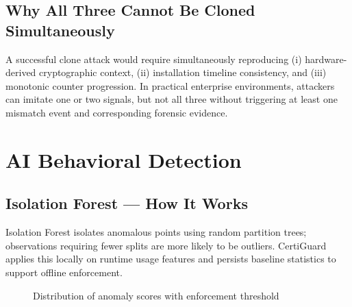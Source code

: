 \documentclass[11pt,a4paper]{article}
\begin{document}
\subsection{Why All Three Cannot Be Cloned Simultaneously}
A successful clone attack would require simultaneously reproducing (i) hardware-derived cryptographic context, (ii) installation timeline consistency, and (iii) monotonic counter progression. In practical enterprise environments, attackers can imitate one or two signals, but not all three without triggering at least one mismatch event and corresponding forensic evidence.

\section{AI Behavioral Detection}

\subsection{Isolation Forest --- How It Works}
Isolation Forest isolates anomalous points using random partition trees; observations requiring fewer splits are more likely to be outliers. CertiGuard applies this locally on runtime usage features and persists baseline statistics to support offline enforcement.

\begin{figure}[H]
\centering
{}
\caption{Distribution of anomaly scores with enforcement threshold}
\end{figure}
\end{document}
